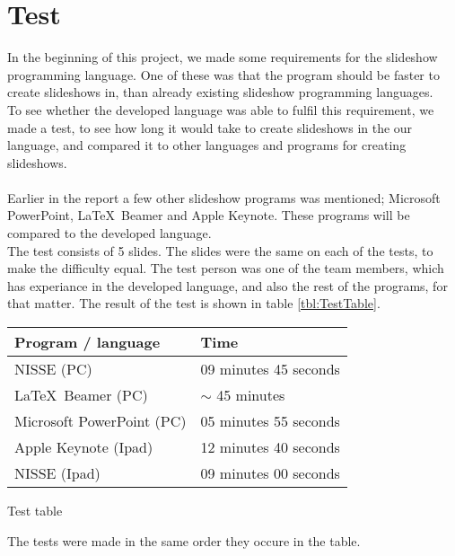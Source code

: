 \chapter{Test}
In the beginning of this project, we made some requirements for the slideshow programming language. One of these was that the program should be faster to create slideshows in, than already existing slideshow programming languages. \\
To see whether the developed language was able to fulfil this requirement, we made a test, to see how long it would take to create slideshows in the our language, and compared it to other languages and programs for creating slideshows.
\\ \\
Earlier in the report a few other slideshow programs was mentioned; Microsoft PowerPoint, \LaTeX~Beamer and Apple Keynote. These programs will be compared to the developed language.\\
The test consists of 5 slides. The slides were the same on each of the tests, to make the difficulty equal. The test person was one of the team members, which has experiance in the developed language, and also the rest of the programs, for that matter.
The result of the test is shown in table \ref{tbl:TestTable}.

\begin{center}
   \begin{tabular}{ | l | l |}
    \hline
    Program / language & Time \\ \hline
    NISSE (PC) & 09 minutes 45 seconds \\ 
    \LaTeX~Beamer (PC) & $\sim$ 45 minutes \\
    Microsoft PowerPoint (PC) & 05 minutes 55 seconds \\ 
    Apple Keynote (Ipad) & 12 minutes 40 seconds \\ 
    NISSE (Ipad) & 09 minutes 00 seconds \\ \hline
    \end{tabular}
    \caption{Test table}
    \label{tbl:TestTable}
\end{center}
The tests were made in the same order they occure in the table.\\

